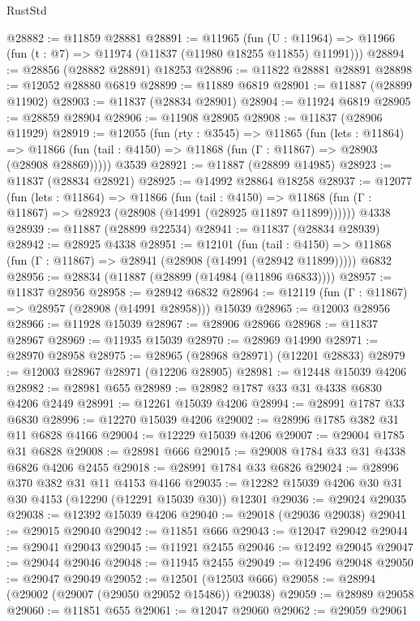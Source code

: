\begin{lexlean}{RustStd}
\begin{coremodule}
@28882 := @11859 @28881
@28891 := @11965
    (fun (U : @11964) => @11966 (fun (t : @7) => @11974 (@11837 (@11980 @18255 @11855) @11991)))
@28894 := @28856 (@28882 @28891) @18253
@28896 := @11822 @28881 @28891
@28898 := @12052 @28880 @6819
@28899 := @11889 @6819
@28901 := @11887 (@28899 @11902)
@28903 := @11837 (@28834 @28901)
@28904 := @11924 @6819
@28905 := @28859 @28904
@28906 := @11908 @28905
@28908 := @11837 (@28906 @11929)
@28919 := @12055
    (fun (rty : @3545) =>
    @11865
      (fun (lets : @11864) =>
      @11866 (fun (tail : @4150) => @11868 (fun (Γ : @11867) => @28903 (@28908 @28869)))))
    @3539
@28921 := @11887 (@28899 @14985)
@28923 := @11837 (@28834 @28921)
@28925 := @14992 @28864 @18258
@28937 := @12077
    (fun (lets : @11864) =>
    @11866
      (fun (tail : @4150) =>
      @11868 (fun (Γ : @11867) => @28923 (@28908 (@14991 (@28925 @11897 @11899))))))
    @4338
@28939 := @11887 (@28899 @22534)
@28941 := @11837 (@28834 @28939)
@28942 := @28925 @4338
@28951 := @12101
    (fun (tail : @4150) => @11868 (fun (Γ : @11867) => @28941 (@28908 (@14991 (@28942 @11899)))))
    @6832
@28956 := @28834 (@11887 (@28899 (@14984 (@11896 @6833))))
@28957 := @11837 @28956
@28958 := @28942 @6832
@28964 := @12119 (fun (Γ : @11867) => @28957 (@28908 (@14991 @28958))) @15039
@28965 := @12003 @28956
@28966 := @11928 @15039
@28967 := @28906 @28966
@28968 := @11837 @28967
@28969 := @11935 @15039
@28970 := @28969 @14990
@28971 := @28970 @28958
@28975 := @28965 (@28968 @28971) (@12201 @28833)
@28979 := @12003 @28967 @28971 (@12206 @28905)
@28981 := @12448 @15039 @4206
@28982 := @28981 @655
@28989 := @28982 @1787 @33 @31 @4338 @6830 @4206 @2449
@28991 := @12261 @15039 @4206
@28994 := @28991 @1787 @33 @6830
@28996 := @12270 @15039 @4206
@29002 := @28996 @1785 @382 @31 @11 @6828 @4166
@29004 := @12229 @15039 @4206
@29007 := @29004 @1785 @31 @6828
@29008 := @28981 @666
@29015 := @29008 @1784 @33 @31 @4338 @6826 @4206 @2455
@29018 := @28991 @1784 @33 @6826
@29024 := @28996 @370 @382 @31 @11 @4153 @4166
@29035 := @12282 @15039 @4206 @30 @31 @30 @4153 (@12290 (@12291 @15039 @30)) @12301
@29036 := @29024 @29035
@29038 := @12392 @15039 @4206
@29040 := @29018 (@29036 @29038)
@29041 := @29015 @29040
@29042 := @11851 @666
@29043 := @12047 @29042
@29044 := @29041 @29043
@29045 := @11921 @2455
@29046 := @12492 @29045
@29047 := @29044 @29046
@29048 := @11945 @2455
@29049 := @12496 @29048
@29050 := @29047 @29049
@29052 := @12501 (@12503 @666)
@29058 := @28994 (@29002 (@29007 (@29050 @29052 @15486)) @29038)
@29059 := @28989 @29058
@29060 := @11851 @655
@29061 := @12047 @29060
@29062 := @29059 @29061

\end{coremodule}
\end{lexlean}
